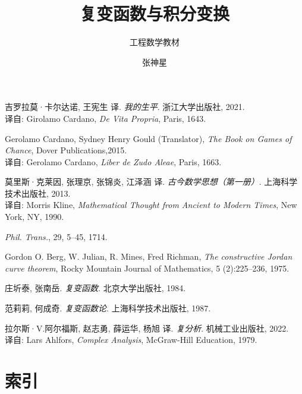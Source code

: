 \documentclass[11pt,a4paper,twoside,openright,scheme=chinese]{ctexbook}
\title{复变函数与积分变换}
\author{张神星}
\subtitle{工程数学教材}
\begin{document}
\maketitle
\hypersetup{pageanchor=true}
\frontmatter

\mainmatter
% 
% 
% 

% 
% 
% 

% 




\begin{thebibliography}{Car43}

吉罗拉莫·卡尔达诺, 王宪生 译.
{\em 我的生平}.
浙江大学出版社, 2021.\\
译自: 
Girolamo Cardano, {\em De Vita Propria}, Paris, 1643.

Gerolamo Cardano, Sydney Henry Gould (Translator),
{\em The Book on Games of Chance}, Dover Publications,2015.\\
译自: 
Gerolamo Cardano, {\em Liber de Zudo Aleae}, Paris, 1663.


莫里斯·克莱因, 张理京, 张锦炎, 江泽涵 译.
{\em 古今数学思想（第一册）}.
上海科学技术出版社, 2013.\\
译自: 
Morris Kline, {\em Mathematical Thought from Ancient to Modern Times}, New York, NY, 1990.


{\em Phil. Trans.}, 29, 5--45, 1714.

Gordon O. Berg, W. Julian, R. Mines, Fred Richman,
{\em The constructive Jordan curve theorem},
Rocky Mountain Journal of Mathematics, 5 (2):225--236,
1975.

庄圻泰, 张南岳.
{\em 复变函数}.
北京大学出版社, 1984.

范莉莉, 何成奇.
{\em 复变函数论}.
上海科学技术出版社, 1987.

拉尔斯·V.阿尔福斯, 赵志勇, 薛运华, 杨旭 译.
{\em 复分析}.
机械工业出版社, 2022.\\
译自: 
Lars Ahlfors, {\em Complex Analysis}, McGraw-Hill Education, 1979.

\end{thebibliography}

% 

\newpage
{}
\chapter*{索\qquad 引}
\begingroup  
\begin{multicols}{2} %
\printindex %
\end{multicols}  
\endgroup  
% 
\end{document}
